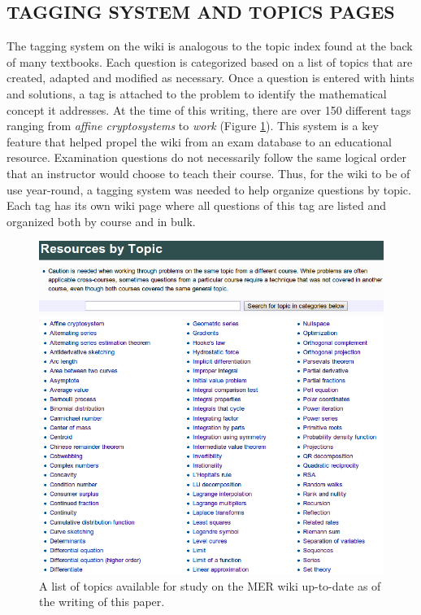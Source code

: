 \documentclass{primus}
\begin{document}
\subsection{TAGGING SYSTEM AND TOPICS PAGES}\label{sec:Tagging_System}
The tagging system on the wiki is analogous to the topic index found at the back of many textbooks. Each question is categorized based on a list of topics that are created, adapted and modified as necessary. Once a question is entered with hints and solutions, a tag is attached to the problem to identify the mathematical concept it addresses. At the time of this writing, there are over 150 different tags ranging from \textit{affine cryptosystems} to \textit{work} (Figure \ref{fig:wiki_tags}). This system is a key feature that helped propel the wiki from an exam database to an educational resource. Examination questions do not necessarily follow the same logical order that an instructor would choose to teach their course. Thus, for the wiki to be of use year-round, a tagging system was needed to help organize questions by topic. Each tag has its own wiki page where all questions of this tag are listed and organized both by course and in bulk.

\begin{figure}[H]
\centering
\includegraphics[width=\textwidth]{figs/Tag_List.png}
\caption{A list of topics available for study on the MER wiki up-to-date as of the writing of this paper.}\label{fig:wiki_tags}
\end{figure}
\end{document}
